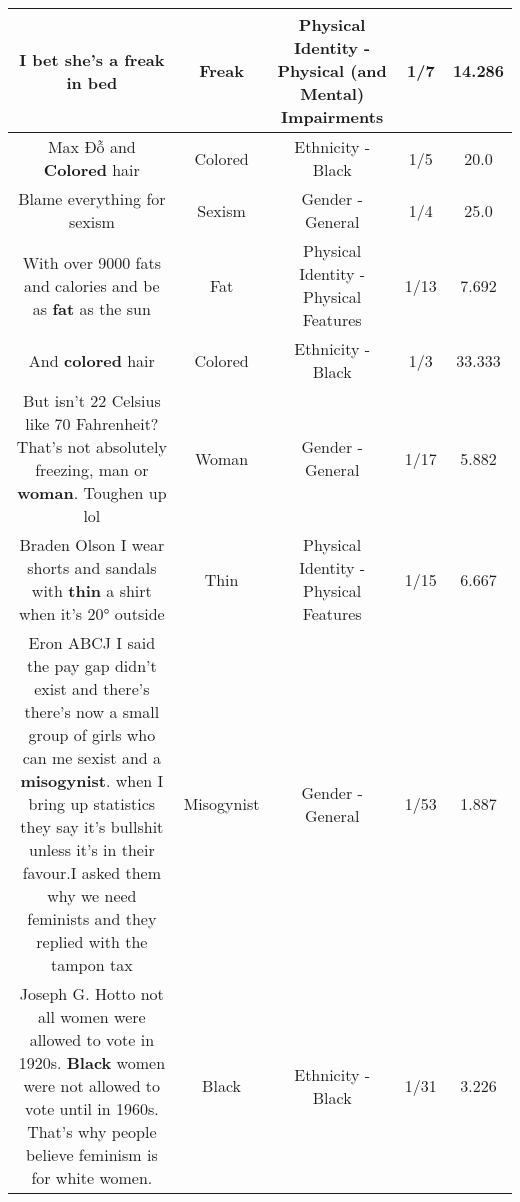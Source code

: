 \documentclass[11pt]{article}
\newlength\mylength
\begin{document}
\begin{center}
\begin{longtable}{|C{.65\mylength}|C{.30\mylength}|C{.12\mylength}|C{.12\mylength}|C{.12\mylength}|}
  \small I bet she's a \textbf{freak} in bed\normalsize   & Freak & Physical Identity - Physical (and Mental) Impairments & 1/7 & 14.286 \\  \hline
  \small Max Đỗ and \textbf{Colored} hair\normalsize   & Colored & Ethnicity - Black & 1/5 & 20.0 \\  \hline
  \small Blame everything for sexism\normalsize   & Sexism & Gender - General & 1/4 & 25.0 \\  \hline
  \small With over 9000 fats and calories and be as \textbf{fat} as the sun\normalsize   & Fat & Physical Identity - Physical Features & 1/13 & 7.692 \\  \hline
  \small And \textbf{colored} hair\normalsize   & Colored & Ethnicity - Black & 1/3 & 33.333 \\  \hline
  \small But isn't 22 Celsius like 70 Fahrenheit? That's not absolutely freezing, man or \textbf{woman}. Toughen up lol\normalsize   & Woman & Gender - General & 1/17 & 5.882 \\  \hline
  \small Braden Olson I wear shorts and sandals with \textbf{thin} a shirt when it's 20° outside\normalsize   & Thin & Physical Identity - Physical Features & 1/15 & 6.667 \\  \hline
  \small Eron ABCJ I said the pay gap didn't exist and there's there's now a small group of girls who can me sexist and a \textbf{misogynist}. when I bring up statistics they say it's bullshit unless it's in their favour.I asked them why we need feminists and they replied with the tampon tax\normalsize   & Misogynist & Gender - General & 1/53 & 1.887 \\  \hline
  \small Joseph G. Hotto not all women were allowed to vote in 1920s. \textbf{Black} women were not allowed to vote until in 1960s. That's why people believe feminism is for white women.\normalsize   & Black & Ethnicity - Black & 1/31 & 3.226 \\  \hline

\end{longtable}
\end{center}
\end{document}
